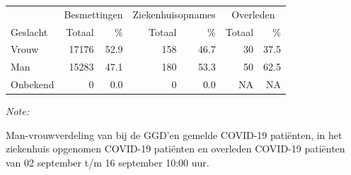 \documentclass[
  english,
  man,floatsintext]{apa6}
\begin{document}
\begin{table}
\centering\begingroup\fontsize{11}{13}\selectfont

\begin{threeparttable}
\begin{tabular}{lrrrrrr}
\toprule
\multicolumn{1}{c}{ } & \multicolumn{2}{c}{Besmettingen} & \multicolumn{2}{c}{Ziekenhuisopnames} & \multicolumn{2}{c}{Overleden} \\
\cmidrule(l{3pt}r{3pt}){2-3} \cmidrule(l{3pt}r{3pt}){4-5} \cmidrule(l{3pt}r{3pt}){6-7}
Geslacht & Totaal & \% & Totaal & \% & Totaal & \%\\
\midrule
Vrouw & 17176 & 52.9 & 158 & 46.7 & 30 & 37.5\\
Man & 15283 & 47.1 & 180 & 53.3 & 50 & 62.5\\
Onbekend & 0 & 0.0 & 0 & 0.0 & NA & NA\\
\bottomrule
\end{tabular}
\begin{tablenotes}
\item \textit{Note: } 
\item Man-vrouwverdeling van bij de GGD’en gemelde COVID-19 patiënten, in het ziekenhuis opgenomen COVID-19 patiënten en overleden COVID-19 patiënten van 02 september t/m 16 september 10:00 uur.
\end{tablenotes}
\end{threeparttable}
\endgroup{}
\end{table}
\newpage
\end{document}
